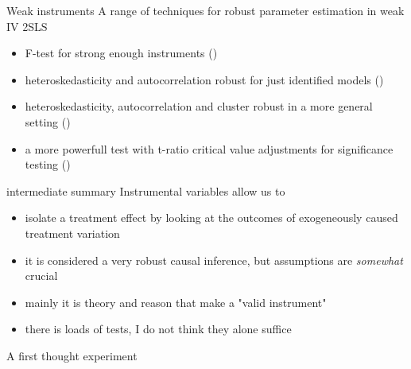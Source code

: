 \documentclass[aspectratio=169]{beamer}
\begin{document}
		\begin{frame}{Weak instruments}
			A range of techniques for robust parameter estimation in weak IV 2SLS \\ \vspace*{.15cm}
			\begin{itemize}
			 \item<1-> F-test for strong enough instruments (\cite{Stock2003})
			 \item<2-> heteroskedasticity and autocorrelation robust for just identified models (\cite{Chernozhukov2008})
			 \item<3-> heteroskedasticity, autocorrelation and cluster robust in a more general setting (\cite{Montiel2013})
			 \item<4-> a more powerfull test with t-ratio critical value adjustments for significance testing (\cite{Lee2020})
		 	\end{itemize}
			\vspace*{.15cm}
		\end{frame}

		\begin{frame}{intermediate summary}
			Instrumental variables allow us to \\ \vspace*{.5cm}
			\begin{itemize}
				\item isolate a treatment effect by looking at the outcomes of exogeneously caused treatment variation
				\item it is considered a very robust causal inference, but assumptions are \textit{somewhat} crucial
				\item mainly it is theory and reason that make a "valid instrument"
				\item there is loads of tests, I do not think they alone suffice
			\end{itemize}
		\end{frame}

		\begin{frame}{A first thought experiment}
			\begin{center}
			\end{center}
		\end{frame}
\end{document}
